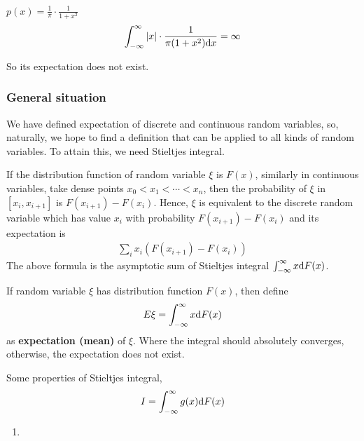 \begin{exa}
    $p(x)=\frac{1}{\pi}\cdot \frac{1}{1+x^2}$
    \begin{align*}
        \int_{-\infty}^\infty |x| \cdot \frac{1}{\pi(1+x^2){\rm d} x } = \infty
    \end{align*}
    
    So its expectation does not exist.
\end{exa}

\subsubsection{General situation}

We have defined expectation of discrete and continuous random variables, so, naturally, we hope to find a definition that can be applied to all kinds of random variables. To attain this, we need Stieltjes integral. 

If the distribution function of random variable $\xi$ is $F(x)$, similarly in continuous variables, take dense points $x_0<x_1<\cdots<x_n$, then the probability of $\xi$ in $[x_i,x_{i+1}]$ is $F(x_{i+1})-F(x_i)$. Hence, $\xi$ is equivalent to the discrete random variable which has value $x_i$ with probability $F(x_{i+1})-F(x_i)$ and its expectation is
\begin{align*}
    \sum_i x_i (F(x_{i+1})-F(x_i))
\end{align*}
The above formula is the asymptotic sum of Stieltjes integral $\int_{-\infty}^\infty x {\rm d} F(x)$.

\begin{defn}
    If random variable $\xi$ has distribution function $F(x)$, then define
    \begin{align}
        E\xi = \int_{-\infty}^\infty x {\rm d}  F(x)
    \end{align}
    as {\bf expectation (mean)} of $\xi$. Where the integral should absolutely converges, otherwise, the expectation does not exist.
\end{defn}

Some properties of Stieltjes integral,
\begin{align}
    I = \int_{-\infty}^\infty g(x) {\rm d} F(x)
\end{align}
\begin{enumerate}
    \item 
\end{enumerate}